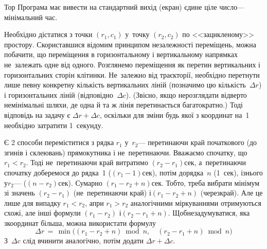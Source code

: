 \documentclass[14pt,a4paper]{extarticle}
\begin{document}
\begin{problemAllDefault}{Тор}
\OutputFile Програма має вивести на стандартний вихід (екран) єдине ціле число\nolinebreak[3] --- мінімальний час.

\Examples
\begin{exampleSimple}{7em}{3em}%
%
%
\end{exampleSimple}


\end{problemAllDefault}
	

{

\Tutorial	Необхідно дістатися з точки $(r_1, c_1)$ у~точку $(r_2, c_2)$ по <<зацикленому>> простору. 
Скориставшися відомим принципом незалежності переміщень, можна побачити, що переміщення в горизонтальному і вертикальному напрямках не~залежать одне від одного. Розглянемо переміщення як перетин вертикальних і горизонтальних сторін клітинки. Не~залежно від траєкторії, необхідно перетнути лише певну конкретну кількість вертикальних ліній (позначимо цю кількість~$\Delta{}r$) і горизонтальних ліній (відповідно~$\Delta{}c$). (Звісно, якщо не\nolinebreak[3] розглядати відверто не\nolinebreak[3] мінімальні шляхи, де одна й та ж лінія перетинається багатократно.) Тоді відповідь на задачу є ${\Delta{}r+\Delta{}c}$, оскільки для зміни будь якої з координат на~1 необхідно затратити 1~секунду.

Є 2 способи переміститися з рядка $r_1$ у~$r_2$\nolinebreak[3] --- перетинаючи край початкового (до згинів і склеювань) прямокутника і не~перетинаючи. Вважаємо спочатку, що ${r_1{<}r_2}$. Тоді не~перетинаючи край витратимо ${(r_2{-}r_1)}$\nolinebreak[2] сек, а~перетинаючи спочатку доберемося до рядка~1 (${(r_1{-}1)}$\nolinebreak[2] сек),  потім до\nolinebreak[1] рядка~$n$ (1~сек), і\nolinebreak[2] з\nolinebreak[2] нього у\nolinebreak[3] $r_2$\nolinebreak[3] --- (${(n{-}r_2)}$\nolinebreak[2] сек). Сумарно ${(r_1{-}r_2{+}n)}$\nolinebreak[2] сек. 
Тобто, треба вибрати мінімум зі значень ${(r_2{-}r_1)}$ (не~перетинаючи край) і\nolinebreak[3] ${(r_1{-}r_2{+}n)}$ (через\nolinebreak[3] край). Але це лише для випадку ${r_1{<}r_2}$, а\nolinebreak[3] при ${r_1{>}r_2}$ аналогічними міркуваннями отримуються схожі, але інші формули ${(r_1{-}r_2)}$ і\nolinebreak[3] ${(r_2{-}r_1{+}n)}$. Щоб\nolinebreak[2] не\nolinebreak[2] задумуватися, яка з\nolinebreak[3] координат більша, можна використати формулу
$$
\Delta{}r \, = \, \min\bigl((r_1-r_2+n) \bmod n,\quad (r_2-r_1+n) \bmod n\bigr)
$$
З~$\Delta{}c$ слід вчинити аналогічно, потім додати ${\Delta{}r+\Delta{}c}$.

}
\end{document}
